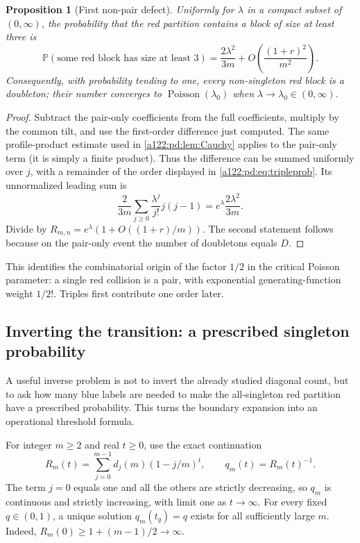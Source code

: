\documentclass[11pt,letterpaper]{article}
\numberwithin{equation}{subsection}
\newtheorem{proposition}[theorem]{Proposition}
\theoremstyle{definition}
\theoremstyle{remark}
\theoremstyle{plain}
\newcommand{\Prob}{\mathbb P}
\newcommand{\Poi}{\operatorname{Poisson}}
\begin{document}
\begin{proposition}[First non-pair defect]\label{a122:pd:prop:triples}
Uniformly for $\lambda$ in a compact subset of $(0,\infty)$, the
probability that the red partition contains a block of size at least
three is
\begin{equation}\label{a122:pd:eq:tripleprob}
 \Prob(\text{some red block has size at least }3)
 =\frac{2\lambda^2}{3m}
 +O\!\left(\frac{(1+r)^2}{m^2}\right).
\end{equation}
Consequently, with probability tending to one, every non-singleton red
block is a doubleton; their number converges to $\Poi(\lambda_0)$
when $\lambda\to\lambda_0\in(0,\infty)$.
\end{proposition}
\begin{proof}
Subtract the pair-only coefficients from the full coefficients, multiply
by the common tilt, and use the first-order difference just computed.
The same profile-product estimate used in \cref{a122:pd:lem:Cauchy} applies to
the pair-only term (it is simply a finite product). Thus the difference
can be summed uniformly over $j$, with a remainder of the order displayed
in \eqref{a122:pd:eq:tripleprob}. Its unnormalized leading sum is
\[
 \frac2{3m}\sum_{j\ge0}\frac{\lambda^j}{j!}j(j-1)
 =e^\lambda\frac{2\lambda^2}{3m}.
\]
Divide by $R_{m,n}=e^\lambda(1+O((1+r)/m))$.
The second statement follows because on the pair-only event the number
of doubletons equals $D$.
\end{proof}

This identifies the combinatorial origin of the factor $1/2$ in the
critical Poisson parameter: a single red collision is a pair, with
exponential generating-function weight $1/2!$. Triples first contribute
one order later.

\subsection{Inverting the transition: a prescribed singleton probability}
\label{a122:pd:sec:inverse}
A useful inverse problem is not to invert the already studied diagonal
count, but to ask how many blue labels are needed to make the all-singleton
red partition have a prescribed probability. This turns the boundary
expansion into an operational threshold formula.

For integer $m\ge2$ and real $t\ge0$, use the exact continuation
\begin{equation}\label{a122:pd:eq:Rreal}
 R_m(t)=\sum_{j=0}^{m-1}d_j(m)(1-j/m)^t,
 \qquad q_m(t)=R_m(t)^{-1}.
\end{equation}
The term $j=0$ equals one and all the others are strictly decreasing,
so $q_m$ is continuous and strictly increasing, with limit one as
$t\to\infty$. For every fixed $q\in(0,1)$, a unique solution
$q_m(t_q)=q$ exists for all sufficiently large $m$.
Indeed, $R_m(0)\ge1+(m-1)/2\to\infty$.
\end{document}
